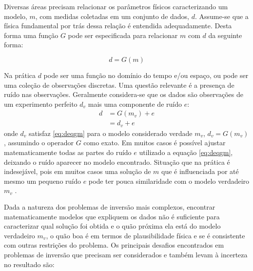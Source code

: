 Diversas áreas precisam relacionar os parâmetros físicos caracterizando um
modelo, $m$, com medidas coletadas em um conjunto de dados, $d$. Assume-se que a
física fundamental por trás dessa relação é entendida adequadamente. Desta forma
uma função $G$ pode ser especificada para relacionar $m$ com $d$ da seguinte
forma:

\begin{equation}
\label{eq:deqgm}
d = G(m)
\end{equation}

Na prática $d$ pode ser uma função no domínio do tempo e/ou espaço, ou pode ser
uma coleção de observações discretas. Uma questão relevante é a presença de
ruído nas observações. Geralmente considera-se que os dados são observações
de um experimento perfeito $d_v$ mais uma componente de ruído $e$:
\begin{equation}
\begin{split}
d &= G(m_v) + e \\
&= d_v + e
\end{split}
\end{equation}
onde $d_v$ satisfaz  \ref{eq:deqgm} para o modelo considerado verdade $m_v$, 
$d_v = G(m_v)$, assumindo o operador $G$ como exato. Em muitos casos é possível
ajustar matematicamente todas as partes do ruído $e$ utilizado a equação \ref{eq:deqgm},
deixando o ruído aparecer no modelo encontrado. Situação que na prática é
indesejável, pois em muitos casos uma solução de $m$ que é influenciada por até
mesmo um pequeno ruído $e$ pode ter pouca similaridade com o modelo verdadeiro
$m_v$ \citep[p. 19]{aster2013parameter}.

Dada a natureza dos problemas de inversão mais complexos, encontrar
matematicamente modelos que expliquem os dados não é suficiente para
caracterizar qual solução foi obtida e o quão próxima ela está do modelo
verdadeiro $m_v$, o quão boa é em termos de plausibilidade física e se é
consistente com outras restrições do problema. Os principais desafios
encontrados em problemas de inversão que precisam ser considerados e também
levam à incerteza no resultado são:

